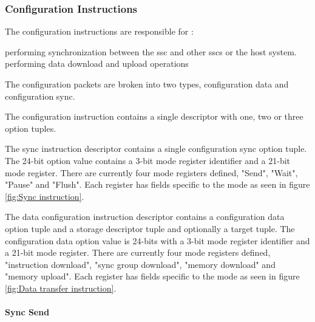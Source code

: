 \subsubsection{Configuration Instructions}
\label{sec:Decoding Configuration Instructions}

The configuration instructions are responsible for :
\begin{outline}
 \1 performing synchronization between the \ac{ssc} and other \acp{ssc} or the host system.
 \1 performing data download and upload operations
\end{outline}

The configuration packets are broken into two types, configuration data and configuration sync.
\iffalse
Currently the sync instruction has been implemented.
It is assumed at this point that adequate infrastructure and extensibility has been built into the system to allow implementation without adding significant amouts of logic.
\fi

The configuration instruction contains a single descriptor with one, two or three option tuples.

The sync instruction descriptor contains a single configuration sync option tuple. The 24-bit option value contains a 3-bit mode register identifier and a 21-bit mode register.
There are currently four mode registers defined, "Send", "Wait", "Pause" and "Flush". Each register has fields specific to the mode as seen in figure \ref{fig:Sync instruction}.

The data configuration instruction descriptor contains a configuration data option tuple and a storage descriptor tuple and optionally a target tuple. 
The configuration data option value is 24-bits with a 3-bit mode register identifier and a 21-bit mode register.
There are currently four mode registers defined, "instruction download", "sync group download", "memory download" and "memory upload". Each register has fields specific to the mode as seen in figure \ref{fig:Data transfer instruction}.

\paragraph{Sync Send}

